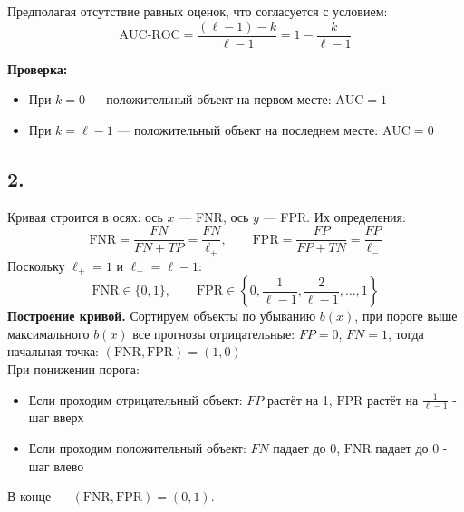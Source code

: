 \documentclass[12pt,a4paper]{article}
\begin{document}
Предполагая отсутствие равных оценок, что согласуется с условием:
\[
\text{AUC-ROC} = \frac{(\ell - 1) - k}{\ell - 1} = 1 - \frac{k}{\ell - 1}
\]

\textbf{Проверка:}
\begin{itemize}
\item При $k = 0$ --- положительный объект на первом месте: $\text{AUC} = 1$
\item При $k = \ell - 1$ --- положительный объект на последнем месте: $\text{AUC} = 0$
\end{itemize}

\subsection*{2.}

Кривая строится в осях: ось $x$ --- FNR, ось $y$ --- FPR. Их определения:
\[
\text{FNR} = \frac{FN}{FN+TP} = \frac{FN}{\ell_+}, \qquad
\text{FPR} = \frac{FP}{FP+TN} = \frac{FP}{\ell_-}
\]
Поскольку $\ell_+ = 1$ и $\ell_- = \ell - 1$:
\[
\text{FNR} \in \{0, 1\}, \qquad \text{FPR} \in \left\{0, \frac{1}{\ell-1}, \frac{2}{\ell-1}, \ldots, 1\right\}
\]
\textbf{Построение кривой.} Сортируем объекты по убыванию $b(x)$, при пороге выше максимального $b(x)$ все прогнозы отрицательные: $FP = 0$, $FN = 1$, тогда начальная точка: $(\text{FNR}, \text{FPR}) = (1, 0)$\\[1mm]
При понижении порога:
\begin{itemize}
\item Если проходим отрицательный объект: $FP$ растёт на 1, $\text{FPR}$ растёт на $\frac{1}{\ell-1}$ - шаг вверх
\item Если проходим положительный объект: $FN$ падает до 0, $\text{FNR}$ падает до 0 - шаг влево
\end{itemize}
В конце --- $(\text{FNR}, \text{FPR}) = (0, 1)$.
\begin{center}
\end{center}
\end{document}
